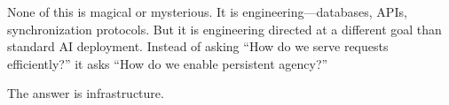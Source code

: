 None of this is magical or mysterious. It is engineering---databases, APIs, synchronization protocols. But it is engineering directed at a different goal than standard AI deployment. Instead of asking ``How do we serve requests efficiently?'' it asks ``How do we enable persistent agency?''

The answer is infrastructure.
